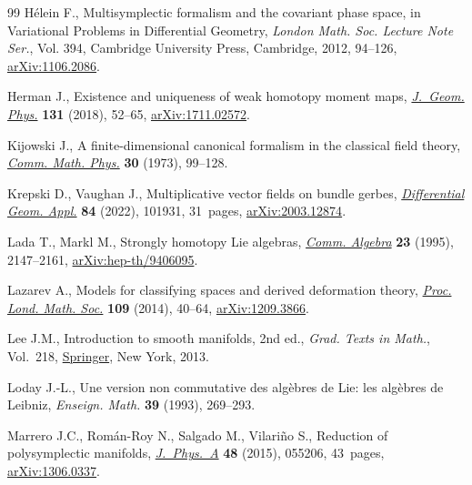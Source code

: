 \begin{thebibliography}{99}
H\'elein F., Multisymplectic formalism and the covariant phase space, in
  Variational Problems in Differential Geometry, \textit{London Math. Soc.
  Lecture Note Ser.}, Vol. 394, Cambridge University Press, Cambridge, 2012,
  94--126, \href{https://arxiv.org/abs/1106.2086}{arXiv:1106.2086}.

Herman J., Existence and uniqueness of weak homotopy moment maps,
  \href{https://doi.org/10.1016/j.geomphys.2018.05.001}{\textit{J.~Geom. Phys.}} \textbf{131} (2018), 52--65, \href{https://arxiv.org/abs/1711.02572}{arXiv:1711.02572}.

Kijowski J., A finite-dimensional canonical formalism in the classical field
  theory, \href{https://doi.org/10.1007/BF01645975}{\textit{Comm. Math. Phys.}} \textbf{30} (1973), 99--128.

Krepski D., Vaughan J., Multiplicative vector fields on bundle gerbes,
  \href{https://doi.org/10.1016/j.difgeo.2022.101931}{\textit{Differential Geom. Appl.}} \textbf{84} (2022), 101931, 31~pages,
  \href{https://arxiv.org/abs/2003.12874}{arXiv:2003.12874}.

Lada T., Markl M., Strongly homotopy {L}ie algebras, \href{https://doi.org/10.1080/00927879508825335}{\textit{Comm. Algebra}}
  \textbf{23} (1995), 2147--2161, \href{https://arxiv.org/abs/hep-th/9406095}{arXiv:hep-th/9406095}.

Lazarev A., Models for classifying spaces and derived deformation theory,
  \href{https://doi.org/10.1112/plms/pdt069}{\textit{Proc. Lond. Math. Soc.}} \textbf{109} (2014), 40--64,
  \href{https://arxiv.org/abs/1209.3866}{arXiv:1209.3866}.

Lee J.M., Introduction to smooth manifolds, 2nd ed., \textit{Grad. Texts in Math.}, Vol.~218, \href{https://doi.org/10.1007/978-1-4419-9982-5}{Springer}, New York, 2013.

Loday J.-L., Une version non commutative des alg\`ebres de {L}ie: les alg\`ebres
  de {L}eibniz, \textit{Enseign. Math.} \textbf{39} (1993), 269--293.

Marrero J.C., Rom\'an-Roy N., Salgado M., Vilari\~no S., Reduction of
  polysymplectic manifolds, \href{https://doi.org/10.1088/1751-8113/48/5/055206}{\textit{J.~Phys.~A}} \textbf{48} (2015), 055206,
  43~pages, \href{https://arxiv.org/abs/1306.0337}{arXiv:1306.0337}.


\end{thebibliography}
